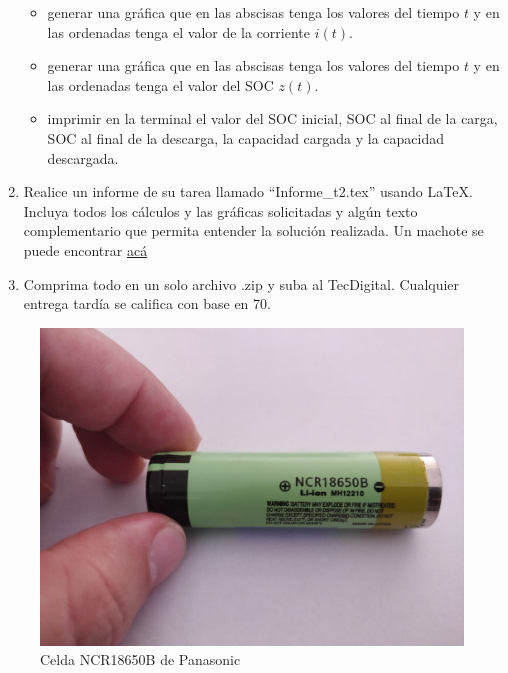 \documentclass[12pt]{article}
\begin{document}
\begin{enumerate}
\begin{itemize}
        \item generar una gráfica que en las abscisas tenga los valores del tiempo $t$ y en las ordenadas tenga el valor de la corriente $i(t)$. 
        \item generar una gráfica que en las abscisas tenga los valores del tiempo $t$ y en las ordenadas tenga el valor del SOC $z(t)$.
        \item imprimir en la terminal el valor del SOC inicial, SOC al final de la carga, SOC al final de la descarga, la capacidad cargada y la capacidad descargada.
    \end{itemize}
    \item Realice un informe de su tarea llamado ``Informe\_t2.tex'' usando \LaTeX. Incluya todos los cálculos y las gráficas solicitadas y algún texto complementario que permita entender la solución realizada. Un machote se puede encontrar \href{https://www.overleaf.com/read/phnwtckqwqwc}{acá}
    \item Comprima todo en un solo archivo .zip y suba al TecDigital. Cualquier entrega tardía se califica con base en 70. 
\end{enumerate}

\begin{figure}[H]
    \centering
    \includegraphics[width=0.6\linewidth]{fig/NCR18650.jpeg}
    \caption{Celda NCR18650B de Panasonic}
    \label{fig:18650}
\end{figure}

% 
% 
\end{document}
